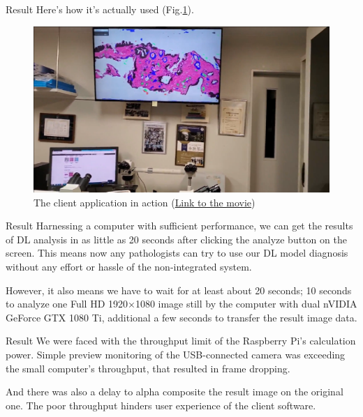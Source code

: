\documentclass[
  dvipdfmx,
  xcolor={svgnames},
  hyperref={colorlinks,citecolor=DeepPink4,linkcolor=DarkRed,urlcolor=DarkBlue}
  ]{beamer}
\begin{document}
\begin{frame}{Result}
  Here's how it's actually used (Fig.\ref{fig:in_action}).
  \begin{figure}[t]\centering
    \includegraphics[width=\columnwidth, keepaspectratio]{assets/thumb.png}
    \caption{The client application in action (\href{https://drive.google.com/file/d/16hUGZ2jU2Def9N5ozNaZnLvjnWc-kkNP/view}{Link to the movie})}
    \label{fig:in_action}
  \end{figure}
\end{frame}

\begin{frame}{Result}
  Harnessing a computer with sufficient performance, we can get the results of DL analysis in as little as 20 seconds after clicking the analyze button on the screen. This means now any pathologists can try to use our DL model diagnosis without any effort or hassle of the non-integrated system.
  \par
  \vspace{0.5zh}
  However, it also means we have to wait for at least about 20 seconds; 10 seconds to analyze one Full HD 1920×1080 image still by the computer with dual nVIDIA GeForce GTX 1080 Ti, additional a few seconds to transfer the result image data.
\end{frame}

\begin{frame}{Result}
  We were faced with the throughput limit of the Raspberry Pi's calculation power. Simple preview monitoring of the USB-connected camera was exceeding the small computer's throughput, that resulted in frame dropping.
  \par
  \vspace{0.5zh}
  And there was also a delay to alpha composite the result image on the original one. The poor throughput hinders user experience of the client software.
\end{frame}
\end{document}
